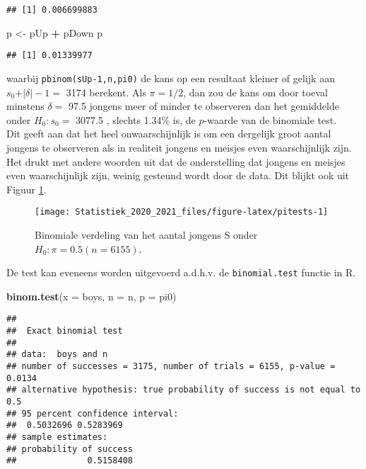 \documentclass[
  12pt,dutch,coursenotes]{book}
\newenvironment{Shaded}{\begin{snugshade}}{\end{snugshade}}
\newcommand{\DataTypeTok}[1]{\textcolor[rgb]{0.13,0.29,0.53}{#1}}
\newcommand{\KeywordTok}[1]{\textcolor[rgb]{0.13,0.29,0.53}{\textbf{#1}}}
\newcommand{\NormalTok}[1]{#1}
\newcommand{\OperatorTok}[1]{\textcolor[rgb]{0.81,0.36,0.00}{\textbf{#1}}}
\newcommand{\StringTok}[1]{\textcolor[rgb]{0.31,0.60,0.02}{#1}}
\theoremstyle{definition}
\theoremstyle{definition}
\theoremstyle{definition}
\theoremstyle{remark}
\begin{document}
\begin{verbatim}
## [1] 0.006699883
\end{verbatim}

\begin{Shaded}
\begin{Highlighting}[]
\NormalTok{p \textless{}{-}}\StringTok{ }\NormalTok{pUp }\OperatorTok{+}\StringTok{ }\NormalTok{pDown}
\NormalTok{p}
\end{Highlighting}
\end{Shaded}

\begin{verbatim}
## [1] 0.01339977
\end{verbatim}

waarbij \texttt{pbinom(sUp-1,n,pi0)} de kans op een resultaat kleiner of gelijk aan \(s_0+\vert \delta\vert -1 =\) 3174 berekent.
Als \(\pi= 1/2\), dan zou de kans om door toeval minstens \(\delta=\) 97.5 jongens meer of minder te observeren dan het gemiddelde onder \(H_0: s_0=\) 3077.5 , slechts 1.34\% is, de \(p\)-waarde van de binomiale test.\\
Dit geeft aan dat het heel onwaarschijnlijk is om een dergelijk groot aantal jongens te
observeren als in realiteit jongens en meisjes even waarschijnlijk zijn.
Het drukt
met andere woorden uit dat de onderstelling dat jongens en meisjes even waarschijnlijk zijn, weinig gesteund wordt door de data.
Dit blijkt ook uit Figuur \ref{fig:pitests}.

\begin{figure}

{\centering \texttt{[image: Statistiek\_2020\_2021\_files/figure-latex/pitests-1]} 

}

\caption{Binomiale verdeling van het aantal jongens S onder $H_0: \pi=0.5 (n=6155)$.}\label{fig:pitests}
\end{figure}

De test kan eveneens worden uitgevoerd a.d.h.v. de \texttt{binomial.test} functie in R.

\begin{Shaded}
\begin{Highlighting}[]
\KeywordTok{binom.test}\NormalTok{(}\DataTypeTok{x =}\NormalTok{ boys, }\DataTypeTok{n =}\NormalTok{ n, }\DataTypeTok{p =}\NormalTok{ pi0)}
\end{Highlighting}
\end{Shaded}

\begin{verbatim}
## 
##  Exact binomial test
## 
## data:  boys and n
## number of successes = 3175, number of trials = 6155, p-value = 0.0134
## alternative hypothesis: true probability of success is not equal to 0.5
## 95 percent confidence interval:
##  0.5032696 0.5283969
## sample estimates:
## probability of success 
##              0.5158408
\end{verbatim}
\end{document}
